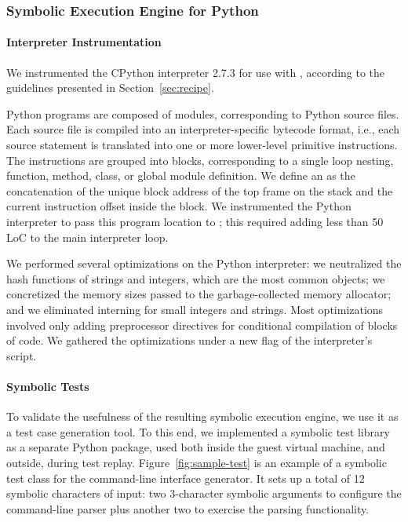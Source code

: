 \subsubsection{Symbolic Execution Engine for Python}
\label{sec:python}

\paragraph{Interpreter Instrumentation}

We instrumented the CPython interpreter 2.7.3 for use with \chef, according to the guidelines presented in Section~\ref{sec:recipe}.

Python programs are composed of modules, corresponding to Python source files.  Each source file is compiled into an interpreter-specific bytecode format, i.e., each source statement is translated into one or more lower-level primitive instructions.  The instructions are grouped into blocks, corresponding to a single loop nesting, function, method, class, or global module definition.
%
We define an \hlpc as the concatenation of the unique block address of the top frame on the stack and the current instruction offset inside the block. We instrumented the Python interpreter to pass this program location to \chef; this required adding less than 50 LoC to the main interpreter loop.

We performed several optimizations on the Python interpreter: we neutralized the hash functions of strings and integers, which are the most common objects; we concretized the memory sizes passed to the garbage-collected memory allocator; and we eliminated interning for small integers and strings.    
%
Most optimizations involved only adding preprocessor directives for conditional compilation of blocks of code.
%
We gathered the optimizations under a new  flag of the interpreter's  script.

\paragraph{Symbolic Tests}

To validate the usefulness of the resulting symbolic execution engine, we use it as a test case generation tool.  To this end, we implemented a symbolic test library as a separate Python package, used both inside the guest virtual machine, and outside, during test replay.
%
Figure~\ref{fig:sample-test} is an example of a symbolic test class for the  command-line interface generator. It sets up a total of 12 symbolic characters of input: two 3-character symbolic arguments to configure the command-line parser plus another two to exercise the parsing functionality.

